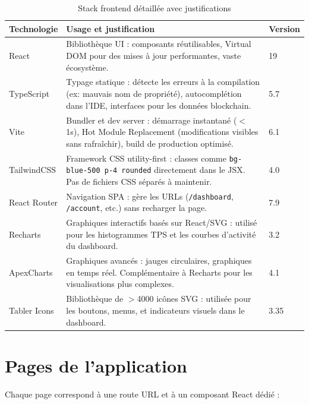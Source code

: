 \documentclass[12pt,a4paper,twoside]{report}
\begin{document}
\begin{table}[H]
\centering
\begin{tabularx}{\textwidth}{lXl}
\toprule
\textbf{Technologie} & \textbf{Usage et justification} & \textbf{Version} \\
\midrule
React & Bibliothèque UI : composants réutilisables, Virtual DOM pour des mises à jour performantes, vaste écosystème. & 19 \\
TypeScript & Typage statique : détecte les erreurs à la compilation (ex: mauvais nom de propriété), autocomplétion dans l'IDE, interfaces pour les données blockchain. & 5.7 \\
Vite & Bundler et dev server : démarrage instantané ($<$1s), Hot Module Replacement (modifications visibles sans rafraîchir), build de production optimisé. & 6.1 \\
TailwindCSS & Framework CSS utility-first : classes comme \texttt{bg-blue-500 p-4 rounded} directement dans le JSX. Pas de fichiers CSS séparés à maintenir. & 4.0 \\
React Router & Navigation SPA : gère les URLs (\texttt{/dashboard}, \texttt{/account}, etc.) sans recharger la page. & 7.9 \\
Recharts & Graphiques interactifs basés sur React/SVG : utilisé pour les histogrammes TPS et les courbes d'activité du dashboard. & 3.2 \\
ApexCharts & Graphiques avancés : jauges circulaires, graphiques en temps réel. Complémentaire à Recharts pour les visualisations plus complexes. & 4.1 \\
Tabler Icons & Bibliothèque de $>$4000 icônes SVG : utilisée pour les boutons, menus, et indicateurs visuels dans le dashboard. & 3.35 \\
\bottomrule
\end{tabularx}
\caption{Stack frontend détaillée avec justifications}
\end{table}

\section{Pages de l'application}

Chaque page correspond à une route URL et à un composant React dédié :
\end{document}
